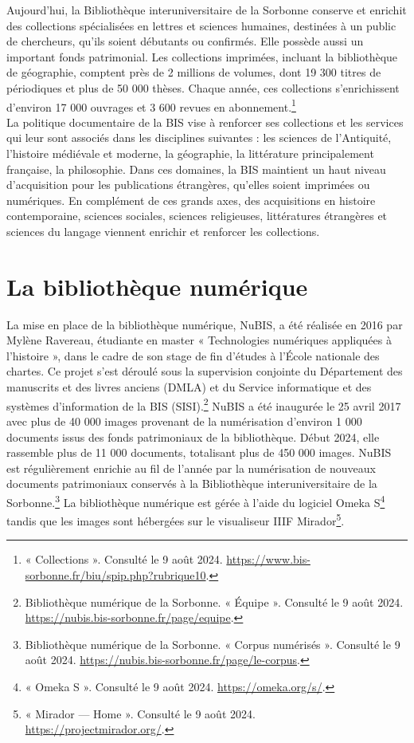 \documentclass[a4paper,12pt,twoside]{book}
\begin{document}
Aujourd'hui, la Bibliothèque interuniversitaire de la Sorbonne conserve
et enrichit des collections spécialisées en lettres et sciences
humaines, destinées à un public de chercheurs, qu'ils
soient débutants ou confirmés. Elle possède aussi un important fonds
patrimonial. Les collections imprimées, incluant la bibliothèque de
géographie, comptent près de 2 millions de volumes, dont 19 300 titres
de périodiques et plus de 50 000 thèses. Chaque année, ces collections
s'enrichissent d'environ 17 000 ouvrages et 3 600 revues en
abonnement.\footnote{« Collections ». Consulté le 9 août 2024.
	\url{https://www.bis-sorbonne.fr/biu/spip.php?rubrique10}.} \\

La politique documentaire de la BIS vise à renforcer ses collections et
les services qui leur sont associés dans les disciplines suivantes : les
sciences de l'Antiquité, l'histoire médiévale et moderne, la géographie,
la littérature principalement française, la philosophie. Dans ces
domaines, la BIS maintient un haut niveau d'acquisition pour les
publications étrangères, qu'elles soient imprimées ou
numériques. En complément de ces grands axes, des acquisitions en
histoire contemporaine, sciences sociales, sciences religieuses,
littératures étrangères et sciences du langage viennent enrichir et
renforcer les collections. 

\section{La bibliothèque numérique}

La mise en place de la bibliothèque numérique, NuBIS, a été réalisée en
2016 par Mylène Ravereau, étudiante en master « Technologies numériques
appliquées à l'histoire », dans le cadre de son stage de fin d'études à
l'École nationale des chartes. Ce projet s'est déroulé
sous la supervision conjointe du Département des manuscrits et des
livres anciens (DMLA) et du Service informatique et des systèmes
d'information de la BIS (SISI).\footnote{Bibliothèque numérique de la
	Sorbonne. « Équipe ». Consulté le 9 août 2024.
	\url{https://nubis.bis-sorbonne.fr/page/equipe}.}
NuBIS a été inaugurée le 25 avril 2017 avec plus de 40 000 images
provenant de la numérisation d'environ 1 000 documents issus des fonds
patrimoniaux de la bibliothèque. Début 2024, elle rassemble plus de 11
000 documents, totalisant plus de 450 000 images. NuBIS est
régulièrement enrichie au fil de l'année par la
numérisation de nouveaux documents patrimoniaux conservés à la
Bibliothèque interuniversitaire de la Sorbonne.\footnote{Bibliothèque
	numérique de la Sorbonne. « Corpus numérisés ». Consulté le 9 août
	2024.
	\url{https://nubis.bis-sorbonne.fr/page/le-corpus}.}
La bibliothèque numérique est gérée à l'aide du logiciel Omeka
S\footnote{« Omeka S ». Consulté le 9 août 2024.
	\url{https://omeka.org/s/}.} tandis que
les images sont hébergées sur le visualiseur IIIF Mirador\footnote{«
	Mirador --- Home ». Consulté le 9 août 2024.
	\url{https://projectmirador.org/}.}. \\
\end{document}
